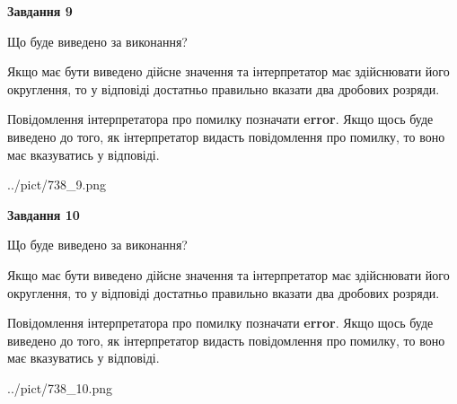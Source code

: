 \documentclass[12pt, ukrainian]{article}
\begin{document}
{\begin {Large}
{\begin {center}\textbf{Завдання 9}\end {center}}\par
Що буде виведено за виконання? \par

Якщо має бути виведено дійсне значення та інтерпретатор має здійснювати його округлення, 
то у відповіді достатньо правильно вказати два дробових розряди.

Повідомлення інтерпретатора про помилку позначати \textbf{error}.
Якщо щось буде виведено до того, як інтерпретатор видасть повідомлення про помилку, 
то воно має вказуватись у відповіді. \par

\begin{center}
	{../pict/738_9.png}
\end{center}
\newpage

{\begin {center}\textbf{Завдання 10}\end {center}}\par
Що буде виведено за виконання? \par

Якщо має бути виведено дійсне значення та інтерпретатор має здійснювати його округлення, 
то у відповіді достатньо правильно вказати два дробових розряди.

Повідомлення інтерпретатора про помилку позначати \textbf{error}.
Якщо щось буде виведено до того, як інтерпретатор видасть повідомлення про помилку, 
то воно має вказуватись у відповіді. \par

\begin{center}
	{../pict/738_10.png}
\end{center}
\newpage

\end {Large}}
\end{document}
